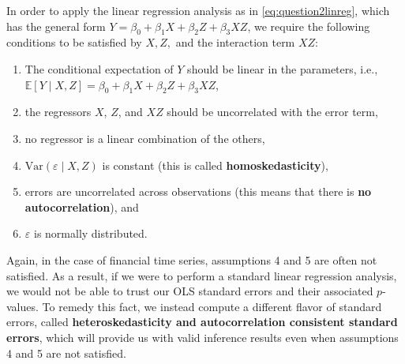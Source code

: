 \documentclass[12pt]{article}
\begin{document}
	
	In order to apply the linear regression analysis as in \autoref{eq:question2linreg}, which has the general form $Y = \beta_0 + \beta_1 X + \beta_2 Z + \beta_3 XZ$, we require the following conditions to be satisfied by $X, Z,$ and the interaction term $XZ$: 
		\begin{enumerate}
			\item The conditional expectation of $Y$ should be linear in the parameters, i.e., $\mathbb{E}[Y \mid X, Z] = \beta_0 + \beta_1 X + \beta_2 Z + \beta_3 XZ$, 
			\item the regressors $X$, $Z$, and $XZ$ should be uncorrelated with the error term,
			\item no regressor is a linear combination of the others,
			\item $\mathrm{Var}(\varepsilon \mid X, Z)$ is constant (this is called \textbf{homoskedasticity}), 
			\item errors are uncorrelated across observations (this means that there is \textbf{no autocorrelation}), and
			\item $\varepsilon$ is normally distributed. 
		\end{enumerate}
	Again, in the case of financial time series, assumptions 4 and 5 are often not satisfied. As a result, if we were to perform a standard linear regression analysis, we would not be able to trust our OLS standard errors and their associated $p$-values. To remedy this fact, we instead compute a different flavor of standard errors, called \textbf{heteroskedasticity and autocorrelation consistent standard errors}, which will provide us with valid inference results even when assumptions 4 and 5 are not satisfied.
	
\end{document}
